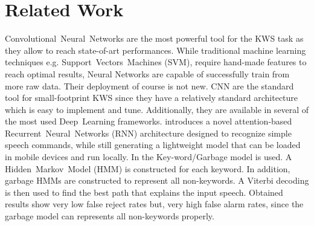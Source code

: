 
\section{Related Work}
\label{sec:related_work}

\noindent 
\mbox{Convolutional Neural Networks} are the most powerful tool for the KWS task as they allow to reach state-of-art performances. \cite {Jansson-2018} While traditional machine learning techniques e.g. \mbox{Support Vectors Machines} (SVM), require hand-made features to reach optimal results, Neural Networks are capable of successfully train from more raw data. \cite{Tang-2018} Their deployment of course is not new. CNN are the standard tool for small-footprint KWS since they have a relatively standard architecture which is easy to implement and tune. Additionally, they are available in several of the most used \mbox{Deep Learning} frameworks. \cite{Andrade-2018} introduces a novel attention-based \mbox{Recurrent Neural Networks} (RNN) architecture designed to recognize simple speech commands, while still generating a lightweight model that can be loaded in mobile devices and run locally. In \cite{Zang-2018} the \mbox{Key-word/Garbage} model is used. A \mbox{Hidden Markov Model} (HMM) is constructed for each keyword. In addition, garbage HMMs are constructed to represent all non-keywords. A Viterbi decoding is then used to find the best path that explains the input speech. Obtained results show very low false reject rates but, very high false alarm rates, since the garbage model can represents all non-keywords properly.